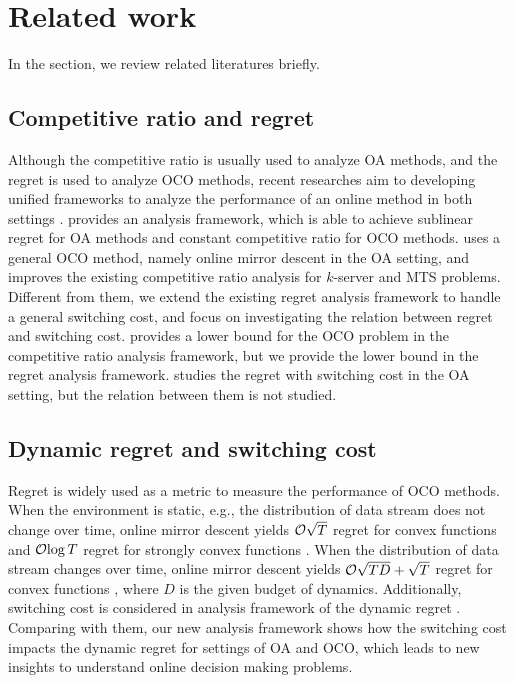 \documentclass[journal]{IEEEtran}
\begin{document}
\section{Related work}
\label{sect_related_work}
In the section, we review related literatures briefly.
\subsection{Competitive ratio and regret}
Although the competitive ratio is usually used to analyze OA methods, and the regret is used to analyze OCO methods, recent researches aim to developing unified frameworks to analyze the performance of an online method in both settings \cite{Blum2000,Abernethy:2010,Antoniadis-10.1007,pmlr-v23-buchbinder12,Bubeck:2018:KVM,Andrew:2013:TTM,Chen:2015:OCO}. \cite{Blum2000} provides an analysis framework, which is able to achieve sublinear regret for OA methods and constant competitive ratio for OCO methods. \cite{Abernethy:2010,pmlr-v23-buchbinder12,Bubeck:2018:KVM} uses a general OCO method, namely online mirror descent in the OA setting, and improves the existing competitive ratio analysis for $k$-server and MTS problems. Different from them, we extend the existing regret analysis framework to handle a general switching cost, and focus on investigating the relation between regret and switching cost. \cite{Antoniadis-10.1007} provides a lower bound for the OCO problem in the competitive ratio analysis framework, but we provide the lower bound in the regret analysis framework. \cite{Andrew:2013:TTM,Chen:2015:OCO} studies the regret with switching cost in the OA setting, but the relation between them is not studied. 


\subsection{Dynamic regret and switching cost}

Regret is widely used as a metric to measure the performance of OCO methods. When the environment is static, e.g., the distribution of data stream does not change over time, online mirror descent yields ${\mathcal{O}}{\sqrt{T}}$ regret for convex functions and  ${\mathcal{O}}{\log T}$ regret for strongly convex functions \cite{introduction-online-optimization,Hazan2016Introduction,ShalevShwartz:2012dz}. When the distribution of data stream changes over time, online mirror descent yields ${\mathcal{O}}{\sqrt{TD}+\sqrt{T}}$ regret for convex functions \cite{Gyorgy:2016}, where $D$ is the given budget of dynamics. Additionally, switching cost is considered in analysis framework of the dynamic regret \cite{7403279,Shit:2018tz}. Comparing with them, our new analysis framework shows how the switching cost impacts the dynamic regret for settings of OA and OCO, which leads to new insights to understand online decision making problems.
\end{document}
